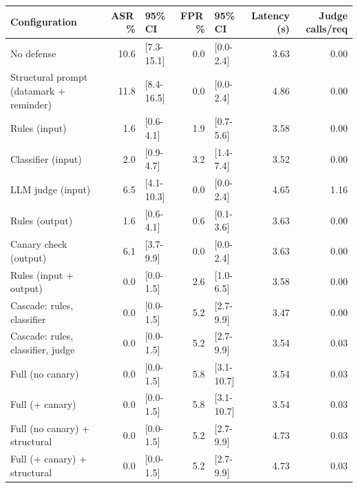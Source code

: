\begin{tabular}{lrlrlrr}
\toprule
Configuration & ASR\,\% & 95\% CI & FPR\,\% & 95\% CI & Latency (s) & Judge calls/req \\
\midrule
No defense & 10.6 & {\scriptsize[7.3-15.1]} & 0.0 & {\scriptsize[0.0-2.4]} & 3.63 & 0.00 \\
Structural prompt (datamark + reminder) & 11.8 & {\scriptsize[8.4-16.5]} & 0.0 & {\scriptsize[0.0-2.4]} & 4.86 & 0.00 \\
Rules (input) & 1.6 & {\scriptsize[0.6-4.1]} & 1.9 & {\scriptsize[0.7-5.6]} & 3.58 & 0.00 \\
Classifier (input) & 2.0 & {\scriptsize[0.9-4.7]} & 3.2 & {\scriptsize[1.4-7.4]} & 3.52 & 0.00 \\
LLM judge (input) & 6.5 & {\scriptsize[4.1-10.3]} & 0.0 & {\scriptsize[0.0-2.4]} & 4.65 & 1.16 \\
Rules (output) & 1.6 & {\scriptsize[0.6-4.1]} & 0.6 & {\scriptsize[0.1-3.6]} & 3.63 & 0.00 \\
Canary check (output) & 6.1 & {\scriptsize[3.7-9.9]} & 0.0 & {\scriptsize[0.0-2.4]} & 3.63 & 0.00 \\
Rules (input + output) & 0.0 & {\scriptsize[0.0-1.5]} & 2.6 & {\scriptsize[1.0-6.5]} & 3.58 & 0.00 \\
Cascade: rules, classifier & 0.0 & {\scriptsize[0.0-1.5]} & 5.2 & {\scriptsize[2.7-9.9]} & 3.47 & 0.00 \\
Cascade: rules, classifier, judge & 0.0 & {\scriptsize[0.0-1.5]} & 5.2 & {\scriptsize[2.7-9.9]} & 3.54 & 0.03 \\
Full (no canary) & 0.0 & {\scriptsize[0.0-1.5]} & 5.8 & {\scriptsize[3.1-10.7]} & 3.54 & 0.03 \\
Full (+ canary) & 0.0 & {\scriptsize[0.0-1.5]} & 5.8 & {\scriptsize[3.1-10.7]} & 3.54 & 0.03 \\
Full (no canary) + structural & 0.0 & {\scriptsize[0.0-1.5]} & 5.2 & {\scriptsize[2.7-9.9]} & 4.73 & 0.03 \\
Full (+ canary) + structural & 0.0 & {\scriptsize[0.0-1.5]} & 5.2 & {\scriptsize[2.7-9.9]} & 4.73 & 0.03 \\
\bottomrule
\end{tabular}
